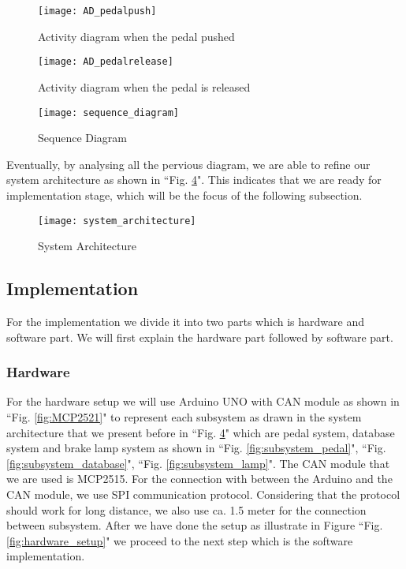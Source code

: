 \begin{figure}[h]
    \centering
    \texttt{[image: AD\_pedalpush]}
    \caption{Activity diagram when the pedal pushed}
    \label{fig:AD_pedalpush}
\end{figure}
\begin{figure}[h]
    \centering
    \texttt{[image: AD\_pedalrelease]}
    \caption{Activity diagram when the pedal is released}
    \label{fig:AD_pedalrelease}
\end{figure}


\begin{figure}[h]
    \centering
    \texttt{[image: sequence\_diagram]}
    \caption{Sequence Diagram}
    \label{fig:sequence_diagram}
\end{figure}

Eventually, by analysing all the pervious diagram,  we are able to refine our system architecture as shown in ``Fig. \ref{fig:system_architecture}".  This indicates that we are ready for implementation stage, which will be the focus of the following subsection.

\begin{figure}[h]
    \centering
    \texttt{[image: system\_architecture]}
    \caption{System Architecture}
    \label{fig:system_architecture}
\end{figure}

\subsection{Implementation}
For the implementation we divide it into two parts which is hardware and software part. We will first explain the hardware part followed by software part.

\subsubsection{Hardware}

For the hardware setup we will use Arduino UNO with CAN module as shown in ``Fig. \ref{fig:MCP2521}" to represent each subsystem as drawn in the system architecture that we present before in ``Fig. \ref{fig:system_architecture}" which are pedal system, database system and brake lamp system as shown in ``Fig. \ref{fig:subsystem_pedal}", ``Fig. \ref{fig:subsystem_database}", ``Fig. \ref{fig:subsystem_lamp}". The CAN module that we are used is MCP2515. For the connection with between the Arduino and the CAN module, we use SPI communication protocol. Considering that the protocol should work for long distance, we also use ca. 1.5 meter for the connection between subsystem. After we have done the setup as illustrate in Figure ``Fig. \ref{fig:hardware_setup}" we proceed to the next step which is the software implementation.

